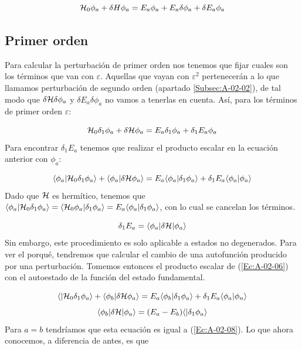 \begin{equation}
    \mathcal{H}_0 \phi_a + \delta H \phi_a = E_a \phi_a + E_a \delta \phi_a + \delta E_a \phi_a  \label{Ec:A-02-05}
\end{equation}

\subsection{Primer orden}

Para calcular la perturbación de primer orden nos tenemos que fijar cuales son los términos que van con $\varepsilon$. Aquellas que vayan con $\varepsilon^2$ pertenecerán a lo que llamamos perturbación de segundo orden (apartado \ref{Subsec:A-02-02}), de tal modo que $\delta\mathcal{H}\delta\phi_a$ y $\delta E_a\delta\phi_a$ no vamos a tenerlas en cuenta. Así, para los términos de primer orden $\varepsilon$:

\begin{equation}
    \mathcal{H}_0 \delta_1 \phi_a + \delta \mathcal{H} \phi_a = E_a \delta_1 \phi_a + \delta_1 E_a \phi_a \label{Ec:A-02-06}
\end{equation}
Para encontrar $\delta_1 E_a$ tenemos que realizar el producto escalar en la ecuación anterior con $\phi_a$:

\begin{equation}
    \langle \phi_a | \mathcal{H}_0 \delta_1 \phi_a \rangle + \langle \phi_a | \delta \mathcal{H} \phi_a \rangle = E_a \langle \phi_a |\delta_1 \phi_a \rangle + \delta_1 E_a \langle \phi_a |\phi_a \rangle
\end{equation}
Dado que $\mathcal{H}$ es hermítico, tenemos que $\langle \phi_a |\mathcal{H}_0 \delta_1 \phi_a\rangle = \langle \mathcal{H}_0 \phi_a |\delta_1 \phi_a\rangle = E_a \langle \phi_a |\delta_1 \phi_a \rangle $, con lo cual se cancelan los términos.

\begin{equation}
    \delta_1 E_a = \langle \phi_a |\delta \mathcal{H} |\phi_a\rangle  \label{Ec:A-02-08}
\end{equation}
Sin embargo, este procedimiento es solo aplicable a estados no degenerados. Para ver el porqué, tendremos que calcular el cambio de una autofunción producido por una perturbación. Tomemos entonces el producto escalar de (\ref{Ec:A-02-06}) con el autoestado de la función del estado fundamental.

\begin{equation*}
    \langle |\mathcal{H}_0 \delta_1 \phi_a \rangle + \langle \phi_b | \delta \mathcal{H} \phi_a\rangle = E_a \langle \phi_b |\delta_1 \phi_a \rangle + \delta_1 E_a \langle \phi_a | \phi_n \rangle
\end{equation*}
\begin{equation}
\langle \phi_b |\delta \mathcal{H} |\phi_a \rangle = (E_a - E_b) \langle |\delta_1 \phi_a\rangle
\end{equation}
Para $a=b$ tendríamos que esta ecuación es igual a (\ref{Ec:A-02-08}). Lo que ahora conocemos, a diferencia de antes, es que


